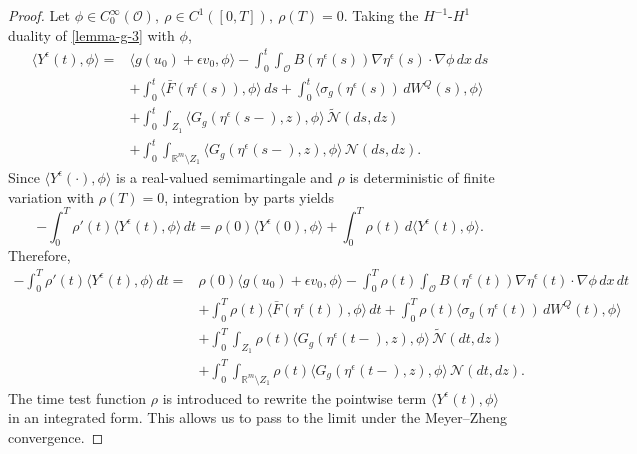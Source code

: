 \documentclass[11pt]{article}
\theoremstyle{plain}
\numberwithin{equation}{section}
\begin{document}
\begin{proof}
Let \(\phi\in C_0^\infty(\mathcal O),~\rho\in C^1([0,T]),~\rho(T)=0.\) Taking the \(H^{-1}\)-\(H^1\) duality of \eqref{lemma-g-3} with \(\phi\),
\[
\begin{aligned}
\langle Y^\epsilon(t),\phi\rangle ={}&\langle g(u_0)+\epsilon v_0,\phi\rangle-\int_0^t\int_{\mathcal O}B(\eta^\epsilon(s))\nabla\eta^\epsilon(s)\cdot\nabla\phi\,dx\,ds        \\
&+\int_0^t\langle \bar F(\eta^\epsilon(s)),\phi\rangle\,ds+\int_0^t\langle \sigma_g(\eta^\epsilon(s))\,dW^Q(s),\phi\rangle        \\
&+\int_0^t\int_{Z_1}\langle G_g(\eta^\epsilon(s-),z),\phi\rangle\,\tilde{\mathcal N}(ds,dz)                                      \\
&+\int_0^t\int_{\mathbb R^m\setminus Z_1}\langle G_g(\eta^\epsilon(s-),z),\phi\rangle\,\mathcal N(ds,dz).
\end{aligned}
\]
Since \(\langle Y^\epsilon(\cdot),\phi\rangle\) is a real-valued semimartingale and \(\rho\) is deterministic of finite variation with
\(\rho(T)=0\), integration by parts yields
\[
-\int_0^T \rho'(t)\langle Y^\epsilon(t),\phi\rangle\,dt=\rho(0)\langle Y^\epsilon(0),\phi\rangle+\int_0^T \rho(t)\,d\langle Y^\epsilon(t),\phi\rangle .
\]
Therefore,
\[
\begin{aligned}
-\int_0^T \rho'(t)\langle Y^\epsilon(t),\phi\rangle\,dt={}&\rho(0)\langle g(u_0)+\epsilon v_0,\phi\rangle   -\int_0^T
\rho(t)\int_{\mathcal O}B(\eta^\epsilon(t))\nabla\eta^\epsilon(t)\cdot\nabla\phi\,dx\,dt  \\
&+\int_0^T\rho(t)\langle \bar F(\eta^\epsilon(t)),\phi\rangle\,dt                  
 +\int_0^T\rho(t)\langle \sigma_g(\eta^\epsilon(t))\,dW^Q(t),\phi\rangle \\
&+\int_0^T\int_{Z_1}\rho(t)\langle G_g(\eta^\epsilon(t-),z),\phi\rangle\,\tilde{\mathcal N}(dt,dz) \\
&+\int_0^T\int_{\mathbb R^m\setminus Z_1}\rho(t)\langle G_g(\eta^\epsilon(t-),z),\phi\rangle\,\mathcal N(dt,dz).
\end{aligned}
\]
The time test function \(\rho\) is introduced to rewrite the pointwise term \(\langle Y^\epsilon(t),\phi\rangle\) in an integrated form. This allows us to
pass to the limit under the Meyer--Zheng convergence.


\end{proof}
\end{document}
